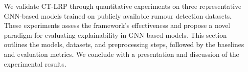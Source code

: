 We validate CT-LRP through quantitative experiments on three representative GNN-based models trained on publicly available rumour detection datasets. These experiments assess the framework’s effectiveness and propose a novel paradigm for evaluating explainability in GNN-based models. This section outlines the models, datasets, and preprocessing steps, followed by the baselines and evaluation metrics. We conclude with a presentation and discussion of the experimental results.







